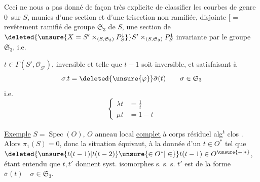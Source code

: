 
Ceci ne nous a pas donné de façon très explicite de classifier les \textquotedbl courbes  de genre $0$\textquotedbl\ sur $S$, munies d'une section et d'une trisection non ramifiée, disjointe
[  = revêtement    ramifié  de groupe $\mathfrak S_3$ de $S$,  une section  de
$\deleted{\unsure{X=S'\times_{(S,\mathfrak S_3)}P^1_S}}S'\times_{(S,\mathfrak S_3)}P^1_S$  invariante par le groupe $\mathfrak S_3$, i.e. 
\par\noindent\begin{minipage}[t]{.21\linewidth}\vspace{0pt}\scriptsize
{}
\end{minipage}\hfill\begin{minipage}[t]{.74\linewidth}\vspace{0pt}
$t\in\Gamma(S',\underline{\mathcal O}_{S'})$, inversible et telle que $t-1$ soit inversible, et satisfaisant à
\[
\sigma.t=\deleted{\unsure{\varphi}}\bar\sigma(t)\qquad \sigma\in\mathfrak S_3
\]
i.e.
\[
\left\{\begin{aligned}
\lambda t&=\frac1t\\
\mu t&=1-t
\end{aligned}\right.
\]


\end{minipage}

\uline{Exemple} \quad $S=\operatorname{Spec}(O)$, $O$ anneau local \uline{complet} à corps résiduel alg\textsuperscript{t} clos  .
Alors  $\pi_1(S)=0$, donc la situation équivaut,  à la donnée d'un $t\in O^*$ tel que $\deleted{\unsure{t(t-1)|t(t-2)}\unsure{\in O^*|\in}}t(t-1)\in O^{\unsure{+|*}}$, étant entendu que $t,t'$ donnent  syst. isomorphes  s. s. s. $t'$ est de la forme $\bar\sigma(t)\quad\sigma\in\mathfrak S_3$.

